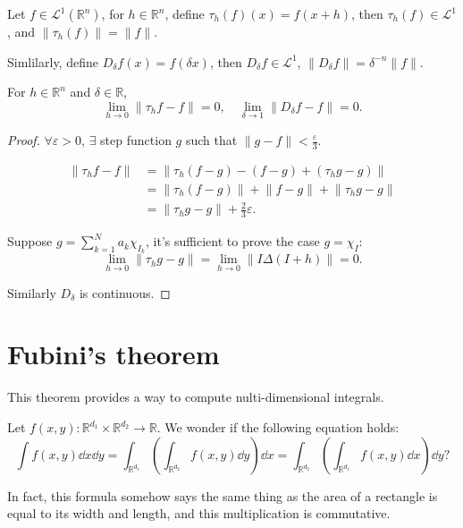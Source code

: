 \begin{proposition}
	Let $f\in \mathcal{L}^1(\mathbb{R}^n)$, for $h\in \mathbb{R}^n$,
	define $\tau_h (f)(x) = f(x+h)$, then  $\tau_h(f)\in \mathcal{L}^1$,
	and $ \lVert \tau_h(f) \rVert = \lVert f \rVert $.

	Simlilarly, define $D_\delta f(x) = f(\delta x)$,
	then  $D_\delta f\in \mathcal{L}^1$,
	$ \lVert D_\delta f \rVert = \delta^{-n} \lVert f \rVert $.
\end{proposition}

\begin{theorem}
	For $h\in \mathbb{R}^n$ and $\delta\in \mathbb{R}$,
	\[
	\lim_{h\to 0}\lVert \tau_h f - f \rVert = 0,\quad
	\lim_{\delta\to 1}\lVert D_\delta f - f \rVert = 0.
	\]
\end{theorem}
\begin{proof}[Proof]
    $\forall\varepsilon>0$,  $\exists$ step function $g$ such that
	$ \lVert g-f \rVert <\frac{\varepsilon}{3}$.

	\begin{align*}
		\lVert \tau_h f-f \rVert
		&= \lVert \tau_h(f-g) -(f-g) + (\tau_h g - g) \rVert \\
		&= \lVert \tau_h(f-g) \rVert + \lVert f-g \rVert +
		\lVert \tau_h g-g \rVert \\
		&= \lVert \tau_h g - g \rVert + \frac{2}{3}\varepsilon.
	\end{align*}

	Suppose $g=\sum_{k=1}^{N} a_k\chi_{I_k}$, it's sufficient to prove the case
	$g = \chi_{I}$:
	\[
	\lim_{h\to 0}\lVert \tau_h g - g \rVert =
	\lim_{h\to 0}\lVert I\Delta (I + h) \rVert = 0.
	\]

	Similarly $D_\delta$ is continuous.
\end{proof}

\section{Fubini's theorem}
\label{sec:Fubini's theorem}
This theorem provides a way to compute nulti-dimensional integrals.

Let $f(x,y) : \mathbb{R}^{d_1}\times \mathbb{R}^{d_2}\to \mathbb{R}$.
We wonder if the following equation holds:
\[
\int f(x,y)\dd x\dd y = \int_{\mathbb{R}^{d_1}}
\left(\int_{\mathbb{R}^{d_2}}f(x,y)\dd y\right) \dd x
= \int_{\mathbb{R}^{d_2}}\left(\int_{\mathbb{R}^{d_1}}f(x,y)\dd x\right)\dd y?
\]

In fact, this formula somehow says the same thing as the area of a rectangle is
equal to its width and length, and this multiplication is commutative.
